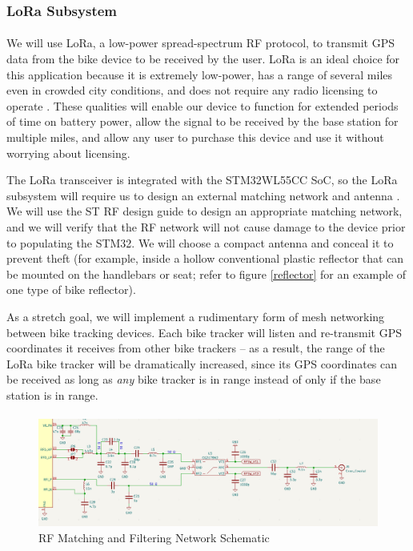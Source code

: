 \documentclass{article}
\begin{document}
\subsubsection{LoRa Subsystem}

\paragraph{} We will use LoRa, a low-power spread-spectrum RF protocol, to transmit GPS data from the bike device to be received by the user. LoRa is an ideal choice for this application because it is extremely low-power, has a range of several miles even in crowded city conditions, and does not require any radio licensing to operate \cite{LoRA}. These qualities will enable our device to function for extended periods of time on battery power, allow the signal to be received by the base station for multiple miles, and allow any user to purchase this device and use it without worrying about licensing. 


The LoRa transceiver is integrated with the STM32WL55CC SoC, so the LoRa subsystem will require us to design an external matching network and antenna \cite{matchingAN}. We will use the ST RF design guide to design an appropriate matching network, and we will verify that the RF network will not cause damage to the device prior to populating the STM32. We will choose a compact antenna and conceal it to prevent theft (for example, inside a hollow conventional plastic reflector that can be mounted on the handlebars or seat; refer to figure \ref{reflector} for an example of one type of bike reflector). 

As a stretch goal, we will implement a rudimentary form of mesh networking between bike tracking devices. Each bike tracker will listen and re-transmit GPS coordinates it receives from other bike trackers -- as a result, the range of the LoRa bike tracker will be dramatically increased, since its GPS coordinates can be received as long as \textit{any} bike tracker is in range instead of only if the base station is in range. 
\paragraph{} 

\begin{figure}[H]
	\includegraphics[width=\textwidth]{rf-ckt.png}
	\caption{RF Matching and Filtering Network Schematic} \label{rf-sch}
\end{figure}
\end{document}
